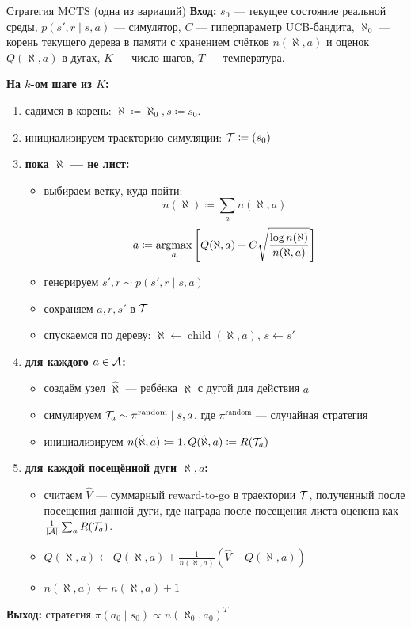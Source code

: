\begin{algorithm}[label=alg:mcts]{Стратегия MCTS (одна из вариаций)}
\textbf{Вход:} $s_0$ --- текущее состояние реальной среды, $p(s', r \mid s, a)$ --- симулятор, $C$ --- гиперпараметр UCB-бандита, $\aleph_0$ --- корень текущего дерева в памяти с хранением счётков $n(\aleph, a)$ и оценок $Q(\aleph, a)$ в дугах, $K$ --- число шагов, $T$ --- температура.

\vspace{0.3cm}
\textbf{На $k$-ом шаге из $K$:}
\begin{enumerate}
    \item садимся в корень: $\aleph \coloneqq \aleph_0, s \coloneqq s_0$.
    \item инициализируем траекторию симуляции: $\mathcal{T} \coloneqq (s_0)$
    \item \textbf{пока $\aleph$ --- не лист:}
        \begin{itemize}
        \item выбираем ветку, куда пойти:
        $$n(\aleph) \coloneqq \sum_a n(\aleph, a)$$
        $$a \coloneqq \mathop{\mathrm{argmax}}\limits_a \left[ Q(\aleph, a) + C \sqrt{\frac{\log n(\aleph)}{n(\aleph, a)}}\right]$$
        \item генерируем $s', r \sim p(s', r \mid s, a)$
        \item сохраняем $a, r, s'$ в $\mathcal{T}$
        \item спускаемся по дереву: $\aleph \leftarrow \operatorname{child}(\aleph, a)$, $s \leftarrow s'$
        \end{itemize}
    \item \textbf{для каждого $a \in \mathcal{A}$:}
        \begin{itemize}
        \item создаём узел $\hat{\aleph}$ --- ребёнка $\aleph$ с дугой для действия $a$
        \item симулируем $\mathcal{T}_a \sim \pi^{\mathrm{random}} \mid s, a$, где $\pi^{\mathrm{random}}$ --- случайная стратегия
        \item инициализируем $n(\hat{\aleph}, a) \coloneqq 1, Q(\hat{\aleph}, a) \coloneqq R(\mathcal{T}_a)$
        \end{itemize}
    \item \textbf{для каждой посещённой дуги $\aleph, a$:}
        \begin{itemize}
        \item считаем $\hat{V}$ --- суммарный reward-to-go в траектории $\mathcal{T}$, полученный после посещения данной дуги, где награда после посещения листа оценена как $\frac{1}{|\mathcal{A}|} \sum_{a} R(\mathcal{T}_a)$.
        \item $Q(\aleph, a) \leftarrow Q(\aleph, a) + \frac{1}{n(\aleph, a)}(\hat{V} - Q(\aleph, a))$
        \item $n(\aleph, a) \leftarrow n(\aleph, a) + 1$
        \end{itemize}
\end{enumerate}

\vspace{0.3cm}
\textbf{Выход:} стратегия $\pi(a_0 \mid s_0) \propto n(\aleph_0, a_0)^T$
\end{algorithm}

